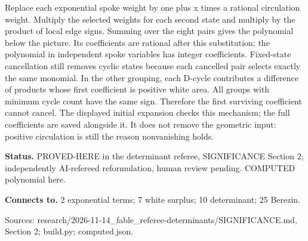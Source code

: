 \documentclass[10pt,a4paper]{amsart}
\begin{document}
Replace each exponential spoke weight by one plus x times a rational circulation weight. Multiply the selected weights for each second state and multiply by the product of local edge signs. Summing over the eight pairs gives the polynomial below the picture. Its coefficients are rational after this substitution; the polynomial in independent spoke variables has integer coefficients. Fixed-state cancellation still removes cyclic states because each cancelled pair selects exactly the same monomial. In the other grouping, each D-cycle contributes a difference of products whose first coefficient is positive white area. All groups with minimum cycle count have the same sign. Therefore the first surviving coefficient cannot cancel. The displayed initial expansion checks this mechanism; the full coefficients are saved alongside it. It does not remove the geometric input: positive circulation is still the reason nonvanishing holds.

\textbf{Status.} PROVED-HERE in the determinant referee, SIGNIFICANCE Section 2; independently AI-refereed reformulation, human review pending. COMPUTED polynomial here.

\textbf{Connects to.} 2 exponential terms; 7 white surplus; 10 determinant; 25 Berezin.

{\footnotesize\raggedright Sources: research/\allowbreak{}2026-11-14\_fable\_referee-determinants/\allowbreak{}SIGNIFICANCE.md, Section 2;\allowbreak{} build.py;\allowbreak{} computed.json.\par}
\end{document}
